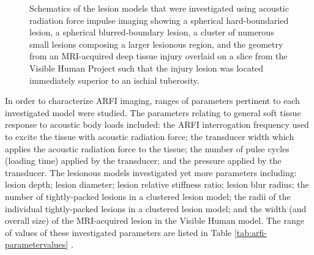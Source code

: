 \begin{figure}[!htb]
{\begin{tikzpicture}[x=0.045\textwidth, y=0.045\textwidth, draw=black, text=black, fill=black]
					\end{tikzpicture}
					\label{fig:arfi_schematic_human}
				}
				\caption[ARFI model schematics]{Schematics of the lesion models that were investigated using acoustic radiation force impulse imaging showing \protect{} a spherical hard-boundaried lesion, \protect{} a spherical blurred-boundary lesion, \protect{} a cluster of numerous small lesions composing a larger lesionous region, and \protect{} the geometry from an MRI-acquired deep tissue injury overlaid on a slice from the Visible Human Project such that the injury lesion was located immediately superior to an ischial tuberosity.}	
				\label{fig:arfi_schematics}
			\end{figure}

			In order to characterize ARFI imaging, ranges of parameters pertinent to each investigated model were studied. The parameters relating to general soft tissue response to acoustic body loads included: the ARFI interrogation frequency used to excite the tissue with acoustic radiation force; the transducer width which applies the acoustic radiation force to the tissue; the number of pulse cycles (loading time) applied by the transducer; and the pressure applied by the transducer. The lesionous models investigated yet more parameters including: lesion depth; lesion diameter; lesion relative stiffness ratio; lesion blur radius; the number of tightly-packed lesions in a clustered lesion model; the radii of the individual tightly-packed lesions in a clustered lesion model; and the width (and overall size) of the MRI-acquired lesion in the Visible Human model. The range of values of these investigated parameters are listed in Table \ref{tab:arfi-parametervalues} .

